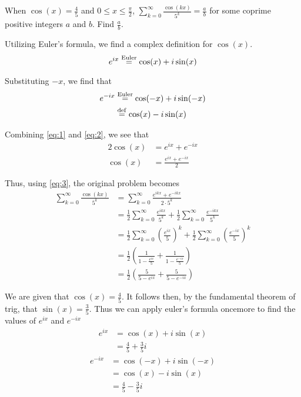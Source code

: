 \documentclass{scrartcl}
\begin{document}
\newpage

\begin{example}[problem]
  When $\cos{(x)}=\frac{4}{5}$ and $0 \leq x \leq \frac{\pi}{2}$, $\displaystyle\sum_{k=0}^{\infty}\frac{\cos{(kx)}}{5^k} = \frac{a}{b}$ for some coprime positive integers $a$ and $b$. Find $\displaystyle\frac{a}{b}$.
\end{example}


Utilizing Euler's formula, we find a complex definition for $\cos(x)$.
\begin{equation}
  e^{ix}\overset{\mathrm{Euler}}{=}\cos(x) + i\sin(x) \label{eq:1}
\end{equation}

Substituting $-x$, we find that
\begin{align}
  \nonumber e^{-ix}&\overset{\mathrm{Euler}}{=}\cos(-x) + i\sin(-x) \\
  &\overset{\mathrm{def}}{=}\cos(x) - i\sin(x) \label{eq:2}
\end{align}

Combining \eqref{eq:1} and \eqref{eq:2}, we see that
\begin{align}
  2\cos(x) &= e^{ix}+e^{-ix} \nonumber \\
  \cos(x) &= \frac{e^{ix}+e^{-ix}}{2} \label{eq:3}
\end{align}

Thus, using \eqref{eq:3}, the original problem becomes
\begin{align}
  \sum_{k=0}^{\infty}\frac{\cos{(kx)}}{5^k} &= \sum_{k=0}^{\infty}\frac{e^{ikx}+e^{-ikx}}{2 \cdot 5^k} \nonumber\\
  &= \frac{1}{2}\sum_{k=0}^{\infty}\frac{e^{ikx}}{5^k}+\frac{1}{2}\sum_{k=0}^{\infty}\frac{e^{-ikx}}{5^k} \nonumber\\
  &= \frac{1}{2}\sum_{k=0}^{\infty}\left(\frac{e^{ix}}{5}\right)^k+\frac{1}{2}\sum_{k=0}^{\infty}\left(\frac{e^{-ix}}{5}\right)^k \nonumber\\
  &=\frac{1}{2}\left(\frac{1}{1-\frac{e^{ix}}{5}} + \frac{1}{1-\frac{e^{-ix}}{5}}\right) \nonumber\\
  &=\frac{1}{2}\left(\frac{5}{5-e^{ix}} + \frac{5}{5-e^{-ix}}\right) \label{eq:4}
\end{align}

We are given that $\cos(x)=\frac{4}{5}$. It follows then, by the fundamental theorem of trig, that $\sin(x)=\frac{3}{5}$. Thus we can apply euler's formula oncemore to find the values of $e^{ix}$ and $e^{-ix}$
\begin{align}
  e^{ix} &= \cos(x) + i\sin(x) \nonumber \\
  &= \frac{4}{5} + \frac{3}{5}i \label{eq:5}
\end{align}
\begin{align}
  e^{-ix} &= \cos(-x) + i\sin(-x) \nonumber \\
  &= \cos(x) - i\sin(x) \nonumber \\
  &= \frac{4}{5} - \frac{3}{5}i \label{eq:6}
\end{align}
\end{document}

